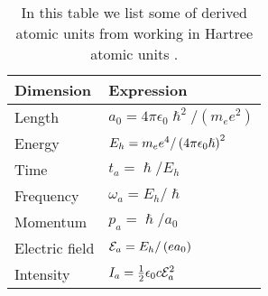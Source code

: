         \begin{table}
            \centering
            \caption{In this table we list some of derived atomic units from
            working in Hartree atomic units \cite{hartree_1928,
            joachain2012atoms}.}
            \renewcommand{\arraystretch}{1.3}
            \begin{tabular}{@{}ll@{}}
                \toprule
                Dimension & Expression
                \\
                \midrule
                Length
                &
                $a_0 = 4\pi\epsilon_0\hslash^2/(m_e e^2)$
                \\
                Energy
                &
                $E_h = m_e e^4/\left( 4\pi \epsilon_0 \hslash \right)^2$
                \\
                Time
                &
                $t_a = \hslash/E_h$
                \\
                Frequency
                &
                $\omega_a = E_h/\hslash$
                \\
                Momentum
                &
                $p_a = \hslash/a_0$
                \\
                Electric field
                &
                $\mathcal{E}_a = E_h/\left( e a_0 \right)$
                \\
                Intensity
                &
                $I_a = \frac{1}{2}\epsilon_0 c \mathcal{E}^2_a$
                \\
                \bottomrule
            \end{tabular}
            \label{tab:atomic-units}
        \end{table}

